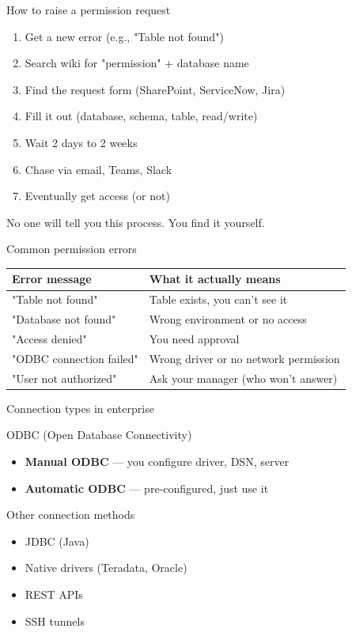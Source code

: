 \documentclass[aspectratio=169, 11pt]{beamer}
\begin{document}
	\begin{frame}{How to raise a permission request}
		\tiny
		\begin{enumerate}
			\item Get a new error (e.g., "Table not found")
			\item Search wiki for "permission" + database name
			\item Find the request form (SharePoint, ServiceNow, Jira)
			\item Fill it out (database, schema, table, read/write)
			\item Wait 2 days to 2 weeks
			\item Chase via email, Teams, Slack
			\item Eventually get access (or not)
		\end{enumerate}
		\vspace{0.05cm}
		\tiny\alert{No one will tell you this process. You find it yourself.}
	\end{frame}
	
	\begin{frame}{Common permission errors}
		\tiny
		\begin{tabular}{p{4cm} p{5cm}}
			\toprule
			\textbf{Error message} & \textbf{What it actually means} \\
			\midrule
			"Table not found" & Table exists, you can't see it \\
			"Database not found" & Wrong environment or no access \\
			"Access denied" & You need approval \\
			"ODBC connection failed" & Wrong driver or no network permission \\
			"User not authorized" & Ask your manager (who won't answer) \\
			\bottomrule
		\end{tabular}
	\end{frame}
	
	\begin{frame}{Connection types in enterprise}
		\tiny
		\begin{block}{ODBC (Open Database Connectivity)}
			\begin{itemize}
				\item \textbf{Manual ODBC} — you configure driver, DSN, server
				\item \textbf{Automatic ODBC} — pre-configured, just use it
			\end{itemize}
		\end{block}
		\begin{block}{Other connection methods}
			\tiny
			\begin{itemize}
				\item JDBC (Java)
				\item Native drivers (Teradata, Oracle)
				\item REST APIs
				\item SSH tunnels
			\end{itemize}
		\end{block}
	\end{frame}
	
\end{document}
